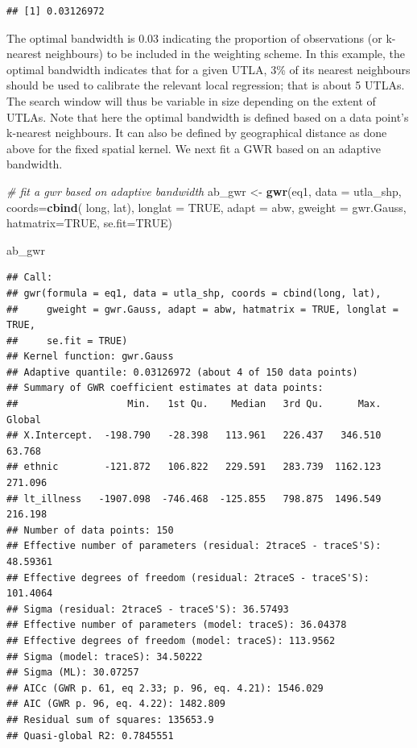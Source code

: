 \documentclass[
]{book}
\newenvironment{Shaded}{\begin{snugshade}}{\end{snugshade}}
\newcommand{\CommentTok}[1]{\textcolor[rgb]{0.56,0.35,0.01}{\textit{#1}}}
\newcommand{\DataTypeTok}[1]{\textcolor[rgb]{0.13,0.29,0.53}{#1}}
\newcommand{\KeywordTok}[1]{\textcolor[rgb]{0.13,0.29,0.53}{\textbf{#1}}}
\newcommand{\NormalTok}[1]{#1}
\newcommand{\OtherTok}[1]{\textcolor[rgb]{0.56,0.35,0.01}{#1}}
\newcommand{\StringTok}[1]{\textcolor[rgb]{0.31,0.60,0.02}{#1}}
\begin{document}
\begin{verbatim}
## [1] 0.03126972
\end{verbatim}

The optimal bandwidth is 0.03 indicating the proportion of observations (or k-nearest neighbours) to be included in the weighting scheme. In this example, the optimal bandwidth indicates that for a given UTLA, 3\% of its nearest neighbours should be used to calibrate the relevant local regression; that is about 5 UTLAs. The search window will thus be variable in size depending on the extent of UTLAs. Note that here the optimal bandwidth is defined based on a data point's k-nearest neighbours. It can also be defined by geographical distance as done above for the fixed spatial kernel. We next fit a GWR based on an adaptive bandwidth.

\begin{Shaded}
\begin{Highlighting}[]
\CommentTok{# fit a gwr based on adaptive bandwidth}
\NormalTok{ab_gwr <-}\StringTok{ }\KeywordTok{gwr}\NormalTok{(eq1, }
            \DataTypeTok{data =}\NormalTok{ utla_shp,}
            \DataTypeTok{coords=}\KeywordTok{cbind}\NormalTok{( long, lat),}
            \DataTypeTok{longlat =} \OtherTok{TRUE}\NormalTok{,}
            \DataTypeTok{adapt =}\NormalTok{ abw, }
            \DataTypeTok{gweight =}\NormalTok{ gwr.Gauss,}
            \DataTypeTok{hatmatrix=}\OtherTok{TRUE}\NormalTok{, }
            \DataTypeTok{se.fit=}\OtherTok{TRUE}\NormalTok{)}

\NormalTok{ab_gwr}
\end{Highlighting}
\end{Shaded}

\begin{verbatim}
## Call:
## gwr(formula = eq1, data = utla_shp, coords = cbind(long, lat), 
##     gweight = gwr.Gauss, adapt = abw, hatmatrix = TRUE, longlat = TRUE, 
##     se.fit = TRUE)
## Kernel function: gwr.Gauss 
## Adaptive quantile: 0.03126972 (about 4 of 150 data points)
## Summary of GWR coefficient estimates at data points:
##                   Min.   1st Qu.    Median   3rd Qu.      Max.  Global
## X.Intercept.  -198.790   -28.398   113.961   226.437   346.510  63.768
## ethnic        -121.872   106.822   229.591   283.739  1162.123 271.096
## lt_illness   -1907.098  -746.468  -125.855   798.875  1496.549 216.198
## Number of data points: 150 
## Effective number of parameters (residual: 2traceS - traceS'S): 48.59361 
## Effective degrees of freedom (residual: 2traceS - traceS'S): 101.4064 
## Sigma (residual: 2traceS - traceS'S): 36.57493 
## Effective number of parameters (model: traceS): 36.04378 
## Effective degrees of freedom (model: traceS): 113.9562 
## Sigma (model: traceS): 34.50222 
## Sigma (ML): 30.07257 
## AICc (GWR p. 61, eq 2.33; p. 96, eq. 4.21): 1546.029 
## AIC (GWR p. 96, eq. 4.22): 1482.809 
## Residual sum of squares: 135653.9 
## Quasi-global R2: 0.7845551
\end{verbatim}
\end{document}
